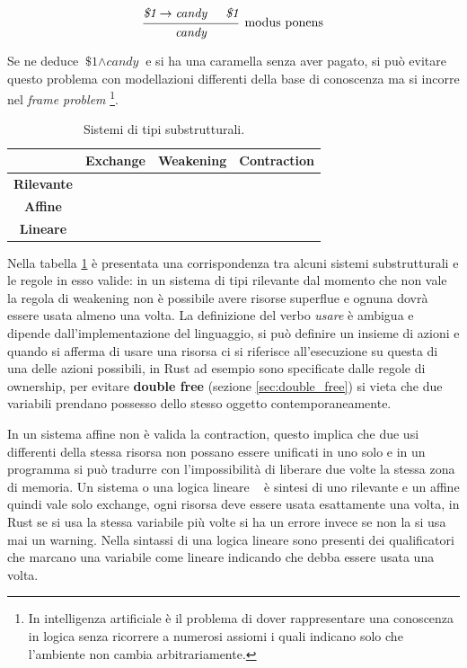 \documentclass[Lau,binding=0.6cm]{sapthesis}
\newcommand{\cmark}{\ding{51}}
\newcommand{\xmark}{\ding{55}}
\begin{document}
\begin{equation*}
  \begin{prooftree}
    \hypo{\textit{\$1} \rightarrow \textit{candy}}
    \hypo{\textit{\$1}}
    \infer2[modus ponens]{\textit{candy}}
  \end{prooftree}
\end{equation*}

Se ne deduce $ \textit{\$1} \land \textit{candy} $ e si ha una caramella senza aver pagato, si può evitare questo problema con modellazioni differenti della base di conoscenza ma si incorre nel \textit{frame problem} \footnote{In intelligenza artificiale è il problema di dover rappresentare una conoscenza in logica senza ricorrere a numerosi assiomi i quali indicano solo che l'ambiente non cambia arbitrariamente.}. 

\begin{table}[h!t]
    \centering
    \caption{Sistemi di tipi substrutturali.}
    \label{tab:substructural_type_systems}
    \begin{tabular}{c|ccc}
        & \textbf{Exchange} & \textbf{Weakening} & \textbf{Contraction} \\
        \hline
        \textbf{Rilevante} & \cmark & \xmark & \cmark\\
        \textbf{Affine} & \cmark & \cmark & \xmark\\
        \textbf{Lineare} & \cmark & \xmark & \xmark\\
    \end{tabular}
\end{table}

Nella tabella \ref{tab:substructural_type_systems} è presentata una corrispondenza tra alcuni sistemi substrutturali e le regole in esso valide: in un sistema di tipi rilevante dal momento che non vale la regola di weakening non è possibile avere risorse superflue e ognuna dovrà essere usata almeno una volta. 
La definizione del verbo \textit{usare} è ambigua e dipende dall'implementazione del linguaggio, si può definire un insieme di azioni e quando si afferma di usare una risorsa ci si riferisce all'esecuzione su questa di una delle azioni possibili, in Rust ad esempio sono specificate dalle regole di ownership, per evitare \textbf{double free} (sezione \ref{sec:double_free}) si vieta che due variabili prendano possesso dello stesso oggetto contemporaneamente.

In un sistema affine non è valida la contraction, questo implica che due usi differenti della stessa risorsa non possano essere unificati in uno solo e in un programma si può tradurre con l'impossibilità di liberare due volte la stessa zona di memoria.
Un sistema o una logica lineare ~\cite{girard:linear_logic} è sintesi di uno rilevante e un affine quindi vale solo exchange, ogni risorsa deve essere usata esattamente una volta, in Rust se si usa la stessa variabile più volte si ha un errore invece se non la si usa mai un warning.
Nella sintassi di una logica lineare sono presenti dei qualificatori che marcano una variabile come lineare indicando che debba essere usata una volta.
\end{document}
